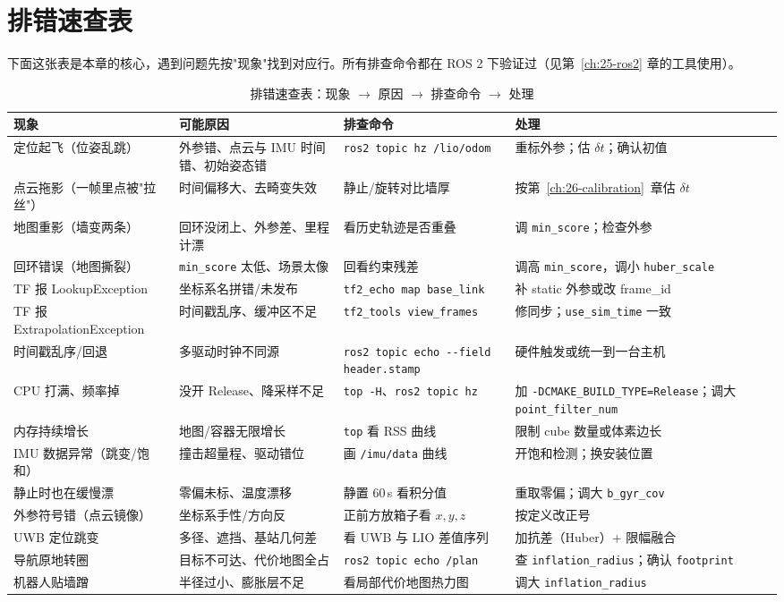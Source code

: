 \section{排错速查表}\label{sec:27-lookup}

下面这张表是本章的核心，遇到问题先按"现象"找到对应行。所有排查命令都在 ROS 2 下验证过（见第~\ref{ch:25-ros2} 章的工具使用）。

\begin{table}[htbp]
  \centering
  \caption{排错速查表：现象 $\to$ 原因 $\to$ 排查命令 $\to$ 处理}\label{tab:27-trouble}
  \footnotesize
  \begin{tabular}{p{2.5cm}p{3.0cm}p{4.3cm}p{4.2cm}}
    \toprule
    现象 & 可能原因 & 排查命令 & 处理 \\
    \midrule
    定位起飞（位姿乱跳） & 外参错、点云与 IMU 时间错、初始姿态错 & \lstinline{ros2 topic hz /lio/odom} & 重标外参；估 $\delta t$；确认初值 \\
    点云拖影（一帧里点被"拉丝"） & 时间偏移大、去畸变失效 & 静止/旋转对比墙厚 & 按第~\ref{ch:26-calibration}~章估 $\delta t$ \\
    地图重影（墙变两条） & 回环没闭上、外参差、里程计漂 & 看历史轨迹是否重叠 & 调 \lstinline{min_score}；检查外参 \\
    回环错误（地图撕裂） & \lstinline{min_score} 太低、场景太像 & 回看约束残差 & 调高 \lstinline{min_score}，调小 \lstinline{huber_scale} \\
    TF 报 LookupException & 坐标系名拼错/未发布 & \lstinline{tf2_echo map base_link} & 补 static 外参或改 frame\_id \\
    TF 报 ExtrapolationException & 时间戳乱序、缓冲区不足 & \lstinline{tf2_tools view_frames} & 修同步；\lstinline{use_sim_time} 一致 \\
    时间戳乱序/回退 & 多驱动时钟不同源 & \lstinline{ros2 topic echo --field header.stamp} & 硬件触发或统一到一台主机 \\
    CPU 打满、频率掉 & 没开 Release、降采样不足 & \lstinline{top -H}、\lstinline{ros2 topic hz} & 加 \lstinline{-DCMAKE_BUILD_TYPE=Release}；调大 \lstinline{point_filter_num} \\
    内存持续增长 & 地图/容器无限增长 & \lstinline{top} 看 RSS 曲线 & 限制 cube 数量或体素边长 \\
    IMU 数据异常（跳变/饱和） & 撞击超量程、驱动错位 & 画 \lstinline{/imu/data} 曲线 & 开饱和检测；换安装位置 \\
    静止时也在缓慢漂 & 零偏未标、温度漂移 & 静置 60\,s 看积分值 & 重取零偏；调大 \lstinline{b_gyr_cov} \\
    外参符号错（点云镜像） & 坐标系手性/方向反 & 正前方放箱子看 $x,y,z$ & 按定义改正号 \\
    UWB 定位跳变 & 多径、遮挡、基站几何差 & 看 UWB 与 LIO 差值序列 & 加抗差（Huber）+ 限幅融合 \\
    导航原地转圈 & 目标不可达、代价地图全占 & \lstinline{ros2 topic echo /plan} & 查 \lstinline{inflation_radius}；确认 \lstinline{footprint} \\
    机器人贴墙蹭 & 半径过小、膨胀层不足 & 看局部代价地图热力图 & 调大 \lstinline{inflation_radius} \\
    \bottomrule
  \end{tabular}
\end{table}

